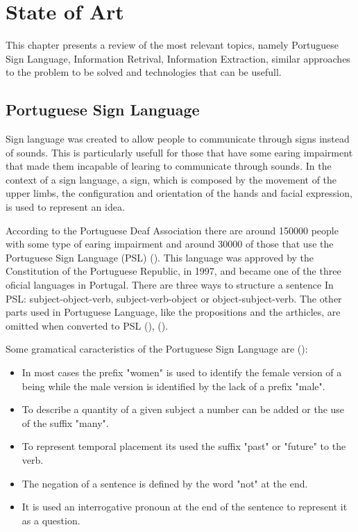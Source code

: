 
\chapter{State of Art}
\label{chap:Chapter3}

This chapter presents a review of the most relevant topics, namely Portuguese Sign Language, Information Retrival, Information Extraction, similar approaches to the problem to be solved and technologies that can be usefull.

\section{Portuguese Sign Language}

Sign language was created to allow people to communicate through signs instead of sounds.
This is particularly usefull for those that have some earing impairment that made them incapable of learing to communicate through sounds.
In the context of a sign language, a sign, which is composed by the movement of the upper limbs, the configuration and orientation of the hands and facial expression, is used to represent an idea.
    
According to the Portuguese Deaf Association there are around 150000 people with some type of earing impairment and around 30000 of those that use the Portuguese Sign Language (PSL) (\cite{gaspar_2015}).
This language was approved by the Constitution of the Portuguese Republic, in 1997, and became one of the three oficial languages in Portugal.
There are three ways to structure a sentence In PSL: subject-object-verb, subject-verb-object or object-subject-verb.
The other parts used in Portuguese Language, like the propositions and the arthicles, are omitted when converted to PSL (\cite{bento_2013}), (\cite{martins_2011}).

Some gramatical caracteristics of the Portuguese Sign Language are (\cite{bento_2013}):

\begin{itemize}
    \item In most cases the prefix "women" is used to identify the female version of a being while the male version is identified by the lack of a prefix "male".
    \item To describe a quantity of a given subject a number can be added or the use of the suffix "many".
    \item To represent temporal placement its used the suffix "past" or "future" to the verb.
    \item The negation of a sentence is defined by the word "not" at the end.
    \item It is used an interrogative pronoun at the end of the sentence to represent it as a question.
\end{itemize}

